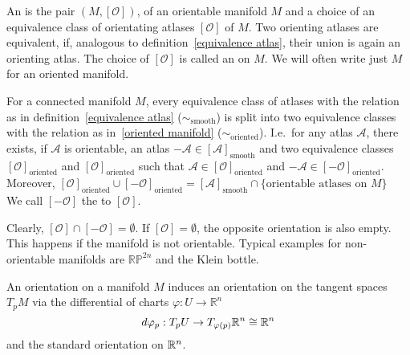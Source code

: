 \documentclass[a4paper,11pt]{article}
\begin{document}

\begin{definition}\label{oriented manifold}%
    An  is the pair \((M,[\mathcal{O}])\), of an orientable manifold \(M\) and a choice of an equivalence class of orientating atlases \([\mathcal{O}]\) of \(M\). 
    Two orienting atlases are equivalent, if, analogous to definition\ \ref{equivalence atlas}, their union is again an orienting atlas. 
    The choice of \([\mathcal{O}]\) is called an  on \(M\).
    We will often write just \(M\) for an oriented manifold.
\end{definition}

\begin{observation}
    For a connected manifold \(M\), every equivalence class of atlases with the relation as in definition\ \ref{equivalence atlas} (\(\sim_{\text{smooth}}\)) is split into two equivalence classes with the relation as in\ \ref{oriented manifold} (\(\sim_{\text{oriented}}\)). 
    I.e.\ for any atlas \(\mathcal{A}\), there exists, 
    if \(\mathcal{A}\) is orientable, 
    an atlas \(-\mathcal{A}\in[\mathcal{A}]_{\text{smooth}}\) and two equivalence classes 
    \([\mathcal{O}]_\text{oriented}\) and \([\mathcal{O}]_{\text{oriented}}\) such that 
    \(\mathcal{A}\in[\mathcal{O}]_\text{oriented}\) and \(-\mathcal{A}\in[-\mathcal{O}]_\text{oriented}\). \\
    Moreover, \([\mathcal{O}]_\text{oriented}\cup[-\mathcal{O}]_\text{oriented}=[\mathcal{A}]_\text{smooth}\cap\{\text{orientable atlases on }M\}\)\\
    We call \([-\mathcal{O}]\) the  to \([\mathcal{O}]\).
\end{observation}

\begin{remark}
    Clearly, \([\mathcal{O}]\cap[-\mathcal{O}]=\emptyset\). If \([\mathcal{O}]=\emptyset\), the opposite orientation is also empty. This happens if the manifold is not orientable. Typical examples for non-orientable manifolds are \(\mathbb{RP}^{2n}\) and the Klein bottle.
\end{remark}

An orientation on a manifold \(M\) induces an orientation on the tangent spaces \(T_p M\) via the differential of charts \(\varphi:U\to\mathbb{R}^n\)
\[d\varphi_p:T_p U\to T_{\varphi(p)}\mathbb{R}^n\cong\mathbb{R}^n\]
and the standard orientation on \(\mathbb{R}^n\).
\end{document}
